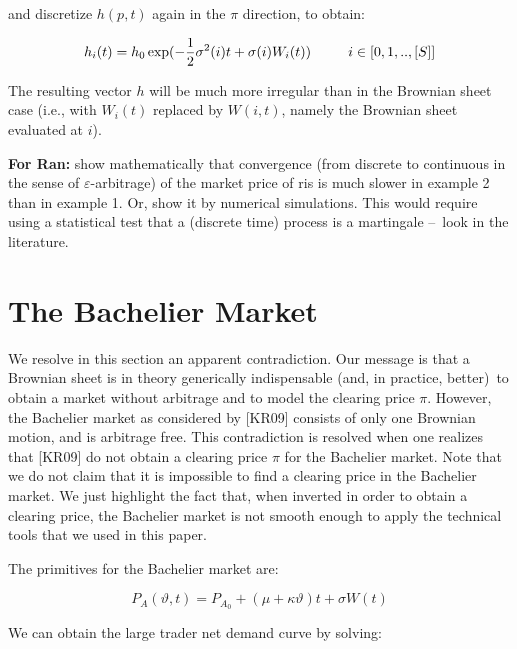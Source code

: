 \documentclass{article}
\begin{document}
and discretize $h(p,t)$ again in the $\pi $ direction, to obtain:

\begin{equation*}
h_{i}(t)=h_{0}\exp (-\frac{1}{2}\sigma ^{2}(i)t+\sigma (i)W_{i}(t))\text{ \
\ \ \ \ }i\in \lbrack 0,1,..,[S]]
\end{equation*}%
\bigskip

The resulting vector $h$ will be much more irregular than in the Brownian
sheet case (i.e., with $W_{i}(t)$ replaced by $W(i,t)$, namely the Brownian
sheet evaluated at $i$).

\bigskip

\textbf{For Ran:} show mathematically that convergence (from discrete to
continuous in the sense of $\varepsilon $-arbitrage) of the market price of
ris is much slower in example 2 than in example 1. Or, show it by numerical
simulations. This would require using a statistical test that a (discrete
time) process is a martingale --\TEXTsymbol{>}\ look in the literature.

\bigskip

\section{The Bachelier Market}

We resolve in this section an apparent contradiction. Our message is that a
Brownian sheet is in theory generically indispensable (and, in practice,
better)\ to obtain a market without arbitrage and to model the clearing
price $\pi $. However, the Bachelier market as considered by [KR09] consists
of only one Brownian motion, and is arbitrage free. This contradiction is
resolved when one realizes that [KR09] do not obtain a clearing price $\pi $
for the Bachelier market. Note that we do not claim that it is impossible to
find a clearing price in the Bachelier market. We just highlight the fact
that, when inverted in order to obtain a clearing price, the Bachelier
market is not smooth enough to apply the technical tools that we used in
this paper.

\bigskip

The primitives for the Bachelier market are:

\begin{equation*}
P_{A}(\vartheta ,t)=P_{A_{0}}+\left( \mu +\kappa \vartheta \right) t+\sigma
W(t)
\end{equation*}

We can obtain the large trader net demand curve by solving:
\end{document}
